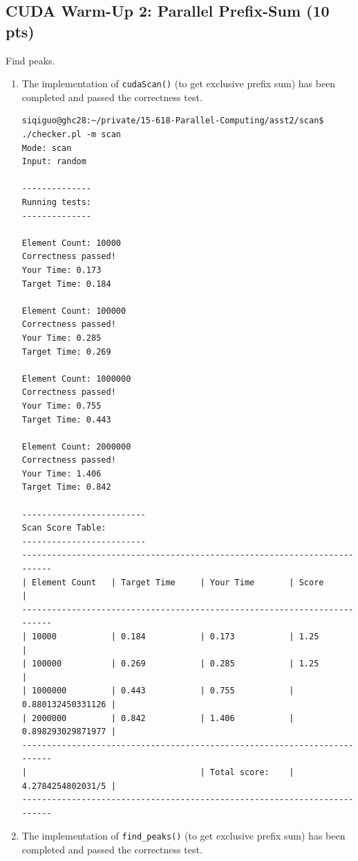 \documentclass[letterpaper,11pt]{exam}
\begin{document}
\begin{questions}
    \newpage

    \question
    \subsection*{CUDA Warm-Up 2: Parallel Prefix-Sum (10 pts)}
    Find peaks.

    \begin{enumerate}[label=\roman*.]
        \item The implementation of \texttt{cudaScan()} (to get exclusive prefix sum) has been completed and passed the correctness test.

              \begin{lstlisting}[]
siqiguo@ghc28:~/private/15-618-Parallel-Computing/asst2/scan$ ./checker.pl -m scan
Mode: scan
Input: random

--------------
Running tests:
--------------

Element Count: 10000
Correctness passed!
Your Time: 0.173
Target Time: 0.184

Element Count: 100000
Correctness passed!
Your Time: 0.285
Target Time: 0.269

Element Count: 1000000
Correctness passed!
Your Time: 0.755
Target Time: 0.443

Element Count: 2000000
Correctness passed!
Your Time: 1.406
Target Time: 0.842

-------------------------
Scan Score Table:
-------------------------
-------------------------------------------------------------------------
| Element Count   | Target Time     | Your Time       | Score           |
-------------------------------------------------------------------------
| 10000           | 0.184           | 0.173           | 1.25            |
| 100000          | 0.269           | 0.285           | 1.25            |
| 1000000         | 0.443           | 0.755           | 0.880132450331126 |
| 2000000         | 0.842           | 1.406           | 0.898293029871977 |
-------------------------------------------------------------------------
|                                   | Total score:    | 4.2784254802031/5 |
-------------------------------------------------------------------------
                \end{lstlisting}

              \newpage
        \item The implementation of \texttt{find\_peaks()} (to get exclusive prefix sum) has been completed and passed the correctness test.


\end{enumerate}
\end{questions}
\end{document}
